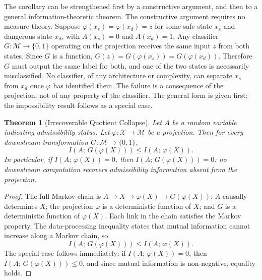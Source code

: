 \documentclass[11pt, a4paper]{article}
\theoremstyle{plain}
\newtheorem{theorem}{Theorem}
\theoremstyle{definition}
\theoremstyle{remark}
\begin{document}
The corollary can be strengthened first by a constructive argument, and then to
a general information-theoretic theorem. The constructive argument requires no
measure theory. Suppose $\varphi(x_s) = \varphi(x_d) = z$ for some safe state
$x_s$ and dangerous state $x_d$, with $A(x_s) = 0$ and $A(x_d) = 1$. Any
classifier $G : \mathcal{M} \to \{0,1\}$ operating on the projection receives
the same input $z$ from both states. Since $G$ is a function, $G(z) =
G(\varphi(x_s)) = G(\varphi(x_d))$. Therefore $G$ must output the same label
for both, and one of the two states is necessarily misclassified. No classifier,
of any architecture or complexity, can separate $x_s$ from $x_d$ once $\varphi$
has identified them. The failure is a consequence of the projection, not of any
property of the classifier. The general form is given first; the impossibility result follows as a special case.

\begin{theorem}[Irrecoverable Quotient Collapse]
\label{thm:guardrail}
Let $A$ be a random variable indicating admissibility status. Let
$\varphi : \mathcal{X} \to \mathcal{M}$ be a projection. Then for every
downstream transformation $G : \mathcal{M} \to \{0,1\}$,
\begin{equation}
  I\!\left(A;\, G(\varphi(X))\right)
  \leq I\!\left(A;\, \varphi(X)\right).
\end{equation}
In particular, if $I(A;\, \varphi(X)) = 0$, then $I(A;\, G(\varphi(X))) = 0$:
no downstream computation recovers admissibility information absent from the
projection.
\end{theorem}

\begin{proof}
The full Markov chain is $A \to X \to \varphi(X) \to G(\varphi(X))$: $A$
causally determines $X$; the projection $\varphi$ is a deterministic function
of $X$; and $G$ is a deterministic function of $\varphi(X)$. Each link in
the chain satisfies the Markov property. The data-processing inequality
\citep{cover2006elements} states that mutual information cannot increase along
a Markov chain, so
\begin{equation}
  I\!\left(A;\, G(\varphi(X))\right)
  \leq I\!\left(A;\, \varphi(X)\right).
\end{equation}
The special case follows immediately: if $I(A;\, \varphi(X)) = 0$, then
$I(A;\, G(\varphi(X))) \leq 0$, and since mutual information is non-negative,
equality holds.
\end{proof}
\end{document}
